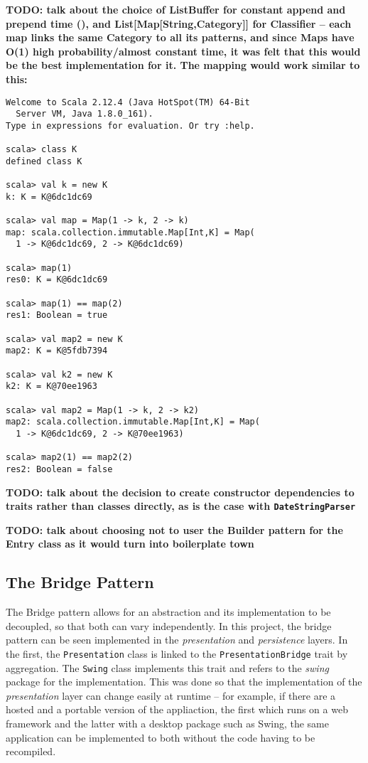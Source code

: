 \textbf{TODO: talk about the choice of ListBuffer for constant append and
prepend time (\cite[][location~15415]{odersky2016scala}), and
List[Map[String,Category]] for Classifier -- each map links the same Category
to all its patterns, and since Maps have O(1) high probability/almost constant
time, it was felt that this would be the best implementation for it. The
mapping would work similar to this:} 

\begin{lstlisting}
Welcome to Scala 2.12.4 (Java HotSpot(TM) 64-Bit 
  Server VM, Java 1.8.0_161).
Type in expressions for evaluation. Or try :help.

scala> class K
defined class K

scala> val k = new K
k: K = K@6dc1dc69

scala> val map = Map(1 -> k, 2 -> k)
map: scala.collection.immutable.Map[Int,K] = Map(
  1 -> K@6dc1dc69, 2 -> K@6dc1dc69)

scala> map(1)
res0: K = K@6dc1dc69

scala> map(1) == map(2)
res1: Boolean = true

scala> val map2 = new K
map2: K = K@5fdb7394

scala> val k2 = new K
k2: K = K@70ee1963

scala> val map2 = Map(1 -> k, 2 -> k2)
map2: scala.collection.immutable.Map[Int,K] = Map(
  1 -> K@6dc1dc69, 2 -> K@70ee1963)

scala> map2(1) == map2(2)
res2: Boolean = false

\end{lstlisting}

\textbf{TODO: talk about the decision to create constructor dependencies to
traits rather than classes directly, as is the case with
\texttt{DateStringParser}}

\textbf{TODO: talk about choosing not to user the Builder pattern for the Entry
class as it would turn into boilerplate town}


\subsection{The Bridge Pattern}
The Bridge pattern allows for an abstraction and its implementation to be
decoupled, so that both can vary independently. In this project, the bridge
pattern can be seen implemented in the \emph{presentation} and
\emph{persistence} layers. In the first, the \texttt{Presentation} class is
linked to the \texttt{PresentationBridge} trait by aggregation. The
\texttt{Swing} class implements this trait and refers to the \emph{swing}
package for the implementation. This was done so that the implementation of the
\emph{presentation} layer can change easily at runtime -- for example, if there
are a hosted and a portable version of the appliaction, the first which runs on
a web framework and the latter with a desktop package such as Swing, the same
application can be implemented to both without the code having to be
recompiled.

